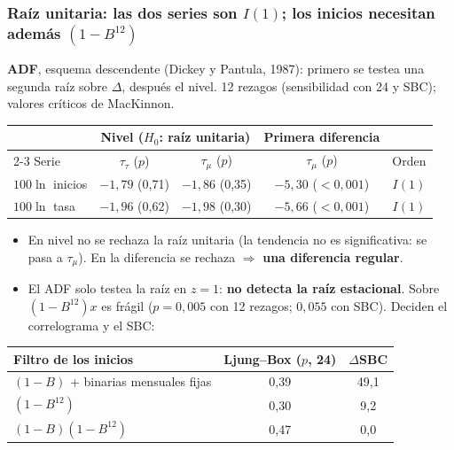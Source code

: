 \documentclass[aspectratio=169]{beamer}
\begin{document}
\begin{frame}
  \frametitle{Raíz unitaria: las dos series son $I(1)$; los inicios necesitan además $(1-B^{12})$}
  \footnotesize
  \textbf{ADF}, esquema descendente (Dickey y Pantula, 1987): primero se testea una segunda raíz sobre $\Delta$, después el nivel. 12 rezagos (sensibilidad con 24 y SBC); valores críticos de MacKinnon.
  \smallskip

  \centering
  \begin{tabular}{lcccc}
    \toprule
    & \multicolumn{2}{c}{Nivel ($H_0$: raíz unitaria)} & Primera diferencia & \\
    \cmidrule(lr){2-3}
    Serie & $\tau_\tau$ ($p$) & $\tau_\mu$ ($p$) & $\tau_\mu$ ($p$) & Orden \\
    \midrule
    $100\ln$ inicios & $-1{,}79$ (0,71) & $-1{,}86$ (0,35) & \alert{$-5{,}30$ ($<0{,}001$)} & $I(1)$ \\
    $100\ln$ tasa & $-1{,}96$ (0,62) & $-1{,}98$ (0,30) & \alert{$-5{,}66$ ($<0{,}001$)} & $I(1)$ \\
    \bottomrule
  \end{tabular}
  \raggedright
  \vspace{-1mm}
  \begin{itemize}\setlength{\itemsep}{0pt}
    \item En nivel no se rechaza la raíz unitaria (la tendencia no es significativa: se pasa a $\tau_\mu$). En la diferencia se rechaza $\Rightarrow$ \textbf{una diferencia regular}.
    \item El ADF solo testea la raíz en $z=1$: \textbf{no detecta la raíz estacional}. Sobre $(1-B^{12})x$ es frágil ($p=0{,}005$ con 12 rezagos; $0{,}055$ con SBC). Deciden el correlograma y el SBC:
  \end{itemize}
  \vspace{-1mm}
  \centering
  \begin{tabular}{lcc}
    \toprule
    Filtro de los inicios & Ljung--Box ($p$, 24) & $\Delta$SBC \\
    \midrule
    $(1-B)$ + binarias mensuales fijas & 0,39 & 49,1 \\
    $(1-B^{12})$ & 0,30 & 9,2 \\
    \alert{$(1-B)(1-B^{12})$} & \alert{0,47} & \alert{0,0} \\
    \bottomrule
  \end{tabular}
\end{frame}
\end{document}
